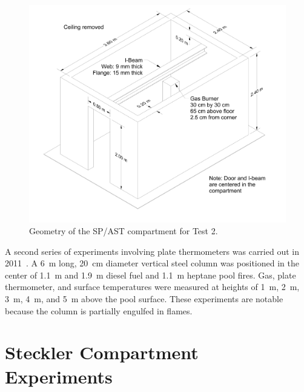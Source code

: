 \begin{figure}[ht]
\includegraphics[width=\textwidth]{FIGURES/SP_AST/SP_AST_Compartment_Drawing.png}
\caption{Geometry of the  SP/AST compartment for Test 2.}
\label{Room_Drawing}
\end{figure}

A second series of experiments involving plate thermometers was carried out in 2011~\cite{Sjostrom:AST}. A 6~m long, 20~cm diameter vertical steel column was positioned in the center of 1.1~m and 1.9~m diesel fuel and 1.1~m heptane pool fires. Gas, plate thermometer, and surface temperatures were measured at heights of 1~m, 2~m, 3~m, 4~m, and 5~m above the pool surface. These experiments are notable because the column is partially engulfed in flames.

\section{Steckler Compartment Experiments}

